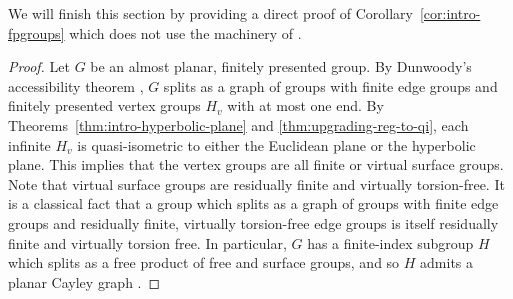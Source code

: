 \documentclass[11pt,a4paper]{amsart}
\theoremstyle{definition}
\begin{document}
We will finish this section by providing a direct proof of Corollary~\ref{cor:intro-fpgroups} which does not use the machinery of \cite{macmanus2023accessibility}.

\maincorollary*

\begin{proof}
    Let $G$ be an almost planar, finitely presented group.
    By Dunwoody's accessibility theorem \cite{dunwoody1985accessibility}, $G$ splits as a graph of groups with finite edge groups and finitely presented vertex groups $H_v$ with at most one end. By Theorems~\ref{thm:intro-hyperbolic-plane} and \ref{thm:upgrading-reg-to-qi}, each infinite $H_v$ is quasi-isometric to either the Euclidean plane or the hyperbolic plane. This implies that the vertex groups are all finite or virtual surface groups. Note that virtual surface groups are residually finite and virtually torsion-free.
    It is a classical fact that a group which splits as a graph of groups with finite edge groups and residually finite, virtually torsion-free edge groups is itself residually finite and virtually torsion free. In particular, $G$ has a finite-index subgroup $H$ which splits as a free product of free and surface groups, and so $H$ admits a planar Cayley graph \cite[Thm.~3]{arzhantseva2004cayley}.
\end{proof}
\end{document}
